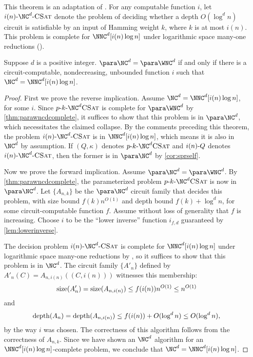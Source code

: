 This theorem is an adaptation of \autocite[Theorem~3.29]{fg06}.
For any computable function $i$, let $\iNCSAT$ denote the problem of deciding whether a depth $O(\log^d n)$ circuit is satisfiable by an input of Hamming weight $k$, where $k$ is at most $i(n)$.
This problem is complete for $\NNC^d[i(n) \log n]$ under logarithmic space many-one reductions \autocite[Theorem~3.6]{cc97lim} ().

\begin{theorem}\label{thm:ncwnc}
  Suppose $d$ is a positive integer.
  $\para \NC^d = \para \WNC^d$ if and only if there is a circuit-computable, nondecreasing, unbounded function $i$ such that $\NC^d = \NNC^d[i(n) \log n]$.
\end{theorem}
\begin{proof}
  First we prove the reverse implication.
  Assume $\NC^d = \NNC^d[i(n) \log n]$, for some $i$.
  Since $\pNCSAT$ is complete for $\para \WNC^d$ by \autoref{thm:parawncdcomplete}, it suffices to show that this problem is in $\para \NC^d$, which necessitates the claimed collapse.
  By the comments preceding this theorem, the problem $\iNCSAT$ is in $\NNC^d[i(n) \log n]$, which means it is also in $\NC^d$ by assumption.
  If $(Q, \kappa)$ denotes $\pNCSAT$ and $i(n) \textnormal{-} Q$ denotes $\iNCSAT$, then the former is in $\para \NC^d$ by \autoref{cor:sprself}.

  Now we prove the forward implication.
  Assume $\para \NC^d = \para \WNC^d$.
  By \autoref{thm:parawncdcomplete}, the parameterized problem $\pNCSAT$ is now in $\para \NC^d$.
  Let $\{A_{n, k}\}$ be the $\para \NC^d$ circuit family that decides this problem, with size bound $f(k) n^{O(1)}$ and depth bound $f(k) + \log^d n$, for some circuit-computable function $f$.
  Assume without loss of generality that $f$ is increasing.
  Choose $i$ to be the ``lower inverse'' function $i_{f, d}$ guaranteed by \autoref{lem:lowerinverse}.

  The decision problem $i(n) \dash \NC^d \dash \textsc{CSat}$ is complete for $\NNC^d[i(n) \log n]$ under logarithmic space many-one reductions by \autocite[Theorem~3.6]{cc97lim}, so it suffices to show that this problem is in $\NC^d$.
  The circuit family $\{A'_n\}$ defined by $A'_n(C) = A_{n, i(n)}((C, i(n)))$ witnesses this membership:
  \[
  \operatorname{size}(A'_n) = \operatorname{size}(A_{n, i(n)}) \leq f(i(n)) n^{O(1)} \leq n^{O(1)}
  \]
  and
  \[
  \operatorname{depth}(A_n) = \operatorname{depth}(A_{n, i(n)}) \leq f(i(n)) + O(\log^d n) \leq O(\log^d n),
  \]
  by the way $i$ was chosen.
  The correctness of this algorithm follows from the correctness of $A_{n, k}$.
  Since we have shown an $\NC^d$ algorithm for an $\NNC^d[i(n) \log n]$-complete problem, we conclude that $\NC^d = \NNC^d[i(n) \log n]$.
\end{proof}


